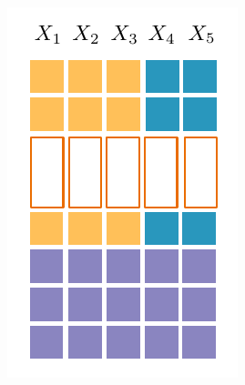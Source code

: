 \documentclass[final]{beamer}
\begin{document}
\begin{frame}{}
\begin{textblock}{60}
\begin{minipage}[t]{4.6364cm}
    \includegraphics[width=\linewidth]{figures/grid-3}                                                               \end{minipage}\hspace{30pt}
\end{textblock}
\end{frame}
\end{document}
